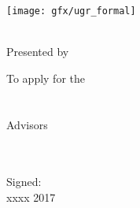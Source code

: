 \begin{titlepage}
    \begin{center}
        \large
        \vspace*{1.5cm}
        \texttt{[image: gfx/ugr\_formal]} \\

        \vspace{1.5cm}

        {\color{ugrGreenery}\spacedallcaps{\myTitle}} \\ \bigskip
	{\textcolor{ugrGray} {\small Presented by}} \\ \bigskip
        \spacedlowsmallcaps{\myName}

        \vspace{1.5cm}
\textcolor{ugrGray}
        {\small To apply for the }\normalsize\\
        \large{} \\ 
        \large{} \\
\vspace{1.5cm}
\textcolor{ugrGray}{\small Advisors }\normalsize\\
        \large\spacedlowsmallcaps{\myDirectorOne}\\
        \large\spacedlowsmallcaps{\myDirectorTwo}\\
        \vspace{3cm}

        {\small Signed: \myName }\\ \bigskip
	xxxx 2017


    \end{center}
\end{titlepage}   
